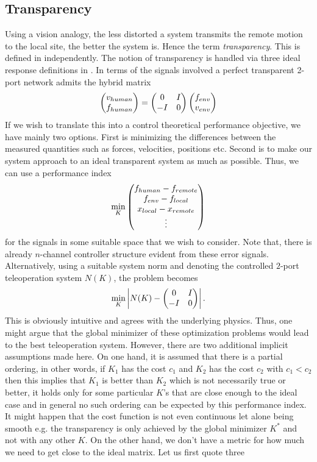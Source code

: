 \subsection{Transparency}
Using a vision analogy, the less distorted a system transmits the remote motion to the local site, the better
the system is. Hence the term \emph{transparency}. This is defined in \cite{lawrence,yokokohjiyoshikawa} independently. 
The notion of transparency is handled via three ideal response definitions in \cite{yokokohjiyoshikawa}. In terms 
of the signals involved a perfect transparent 2-port network admits the hybrid matrix 
\[
\begin{pmatrix}v_{human}\\f_{human}\end{pmatrix}=\begin{pmatrix}0&I\\-I&0\end{pmatrix}\begin{pmatrix}f_{env}\\v_{env}\end{pmatrix}
\]
If we wish to translate this into a control theoretical performance objective, we have mainly two options. First 
is minimizing the differences between the measured quantities such as forces, velocities, positions etc. Second is 
to make our system approach to an ideal transparent system as much as possible. Thus, we can use a performance index
\[
\min_K \begin{pmatrix}f_{human}-f_{remote}\\f_{env}-f_{local}\\x_{local}-x_{remote}\\\vdots\end{pmatrix} 
\]
for the signals in some suitable space that we wish to consider. Note that, there is already $n$-channel controller
structure evident from these error signals.  Alternatively, using a suitable system norm and denoting the controlled 
$2$-port teleoperation system $N(K)$, the problem becomes
\[
\min_K \displaystyle \left|N(K) - \begin{pmatrix}0&I\\-I&0\end{pmatrix}\right|.
\]
This is obviously intuitive and agrees with the underlying physics. Thus, one might argue that the global minimizer
of these optimization problems would lead to the best teleoperation system. However, there are two additional implicit 
assumptions made here. On one hand, it is assumed that there is a partial ordering, in other words, if $K_1$ has the cost 
$c_1$ and $K_2$ has the cost $c_2$ with $c_1<c_2$ then this implies that $K_1$ is better than $K_2$ which is not 
necessarily true or better, it holds only for some particular $K$'s that are close enough to the ideal case and in general no
such ordering can be expected by this performance index. It might happen that the cost function is not even continuous 
let alone being smooth e.g. the transparency is only achieved by the global minimizer $K^*$ and not with any other $K$. 
On the other hand, we don't have a metric for how much we need to get close to the ideal matrix. Let us first quote three 
